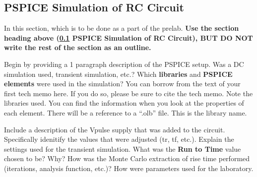 \documentclass[11pt]{article}
\begin{document}
\subsection{PSPICE Simulation of RC Circuit}
\label{Section:PSPICE}
In this section, which is to be done as a part of the prelab. \textbf{ Use the section heading above (\ref{Section:PSPICE} PSPICE Simulation of RC Circuit), BUT DO NOT write the rest of the section as an outline.}

Begin by providing a 1 paragraph description of the PSPICE setup. Was a DC simulation used, transient simulation, etc.?  Which \textbf{libraries} and \textbf{PSPICE elements} were used in the simulation? You can borrow from the text of your first tech memo here.  If you do so, please be sure to cite the tech memo. Note the libraries used. You can find the information when you look at the properties of each element.  There will be a reference to a ``.olb'' file.  This is the library name. 

Include a description of the Vpulse supply that was added to the circuit.  Specifically idenitify the values that were adjusted (tr, tf, etc.).  Explain the settings used for the transient simulation.  What was the \textbf{Run to Time} value chosen to be?  Why?  How was the Monte Carlo extraction of rise time performed (iterations, analysis function, etc.)? How were parameters used for the laboratory.
\clearpage
\end{document}
